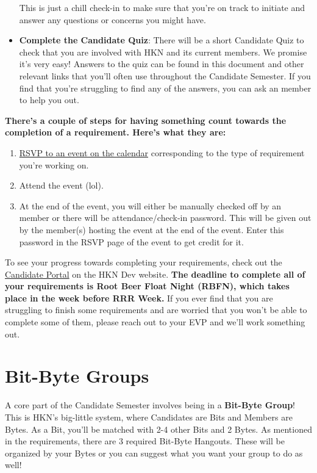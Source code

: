 \documentclass[11pt, article, oneside]{memoir}
\begin{document}
\begin{itemize}
                    This is just a chill check-in to make sure that you're on track to initiate and answer any questions or concerns you might have.
                \item
                    \textbf{Complete the Candidate Quiz}: There will be a short Candidate Quiz to check that you are involved with HKN and its current members.
                    We promise it's very easy!
                    Answers to the quiz can be found in this document and other relevant links that you'll often use throughout the Candidate Semester.
                    If you find that you're struggling to find any of the answers, you can ask an member to help you out.
            \end{itemize}

        \textbf{
            There's a couple of steps for having something count towards the completion of a requirement.
            Here's what they are:
        }
        \begin{enumerate}
            \item
                \href{https://hkn.mu/cal}{RSVP to an event on the calendar} corresponding to the type of requirement you're working on.
            \item
                Attend the event (lol).
            \item
                At the end of the event, you will either be manually checked off by an member or there will be attendance/check-in password.
                This will be given out by the member(s) hosting the event at the end of the event.
                Enter this password in the RSVP page of the event to get credit for it.
        \end{enumerate}
        To see your progress towards completing your requirements, check out the \href{https://hkn.mu/candportal}{Candidate Portal} on the HKN Dev website.
        \textbf{The deadline to complete all of your requirements is Root Beer Float Night (RBFN), which takes place in the week before RRR Week.}
        If you ever find that you are struggling to finish some requirements and are worried that you won't be able to complete some of them, please reach out to your EVP and we'll work something out.
    
    \section{Bit-Byte Groups}
    \label{sec:bit-byte-groups}
        A core part of the Candidate Semester involves being in a \textbf{Bit-Byte Group}!
        This is HKN's big-little system, where Candidates are Bits and Members are Bytes.
        As a Bit, you'll be matched with 2-4 other Bits and 2 Bytes.
        As mentioned in the requirements, there are 3 required Bit-Byte Hangouts.
        These will be organized by your Bytes or you can suggest what you want your group to do as well! \\
\end{document}
